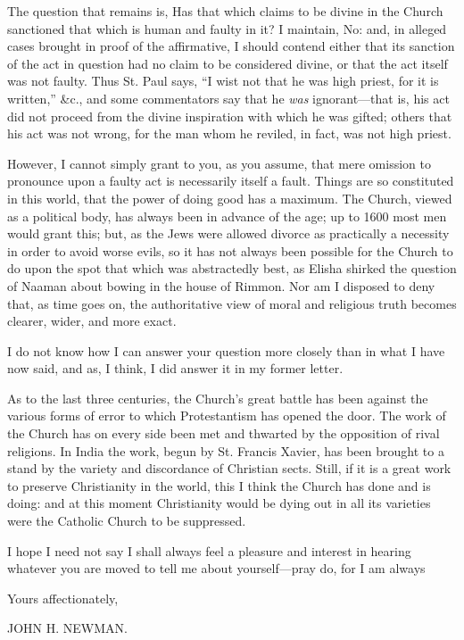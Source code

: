 The question that remains is, Has that which
claims to be divine in the Church sanctioned that which is human and
faulty in it? I maintain, No: and, in alleged cases brought in proof
of the affirmative, I should contend either that its sanction of the
act in question had no claim to be considered divine, or that the act
itself was not faulty. Thus St. Paul says, ``I wist not that he was
high priest, for it is written,'' \&c., and some commentators say
that he \emph{was} ignorant—that is, his act did not proceed from
the divine inspiration with which he was gifted; others that his act
was not wrong, for the man whom he reviled, in fact, was not high
priest.

However, I cannot simply grant to you, as you
assume, that mere omission to pronounce upon a faulty act is
necessarily itself a fault. Things are so constituted in this world,
that the power of doing good has a maximum. The Church, viewed as a
political body, has always been in advance of the age; up to 1600 most
men would grant this; but, as the Jews were allowed divorce as
practically a necessity in order to avoid worse evils, so it has not
always been possible for the Church to do upon the spot that which was
abstractedly best, as Elisha shirked the question of Naaman about
bowing in the house of Rimmon. Nor am I disposed to deny that, as time
goes on, the authoritative view of moral and religious truth becomes
clearer, wider, and more exact.

I do not know how I can answer your question more
closely than in what I have now said, and as, I think, I did answer it
in my former letter.

As to the last three centuries, the Church's
great battle has been against the various forms of error to which
Protestantism has opened the door. The work of the Church has on every
side been met and thwarted by the opposition of rival religions. In
India the work, begun by St. Francis Xavier, has been brought to a
stand by the variety and discordance of Christian sects. Still, if it
is a great work to preserve Christianity in the world, this I think
the Church has done and is doing: and at this moment Christianity
would be dying out in all its varieties were the Catholic Church to be
suppressed.

I hope I need not say I shall always feel a
pleasure and interest in hearing whatever you are moved to tell me
about yourself—pray do, for I am always

Yours affectionately,

JOHN H. NEWMAN.

